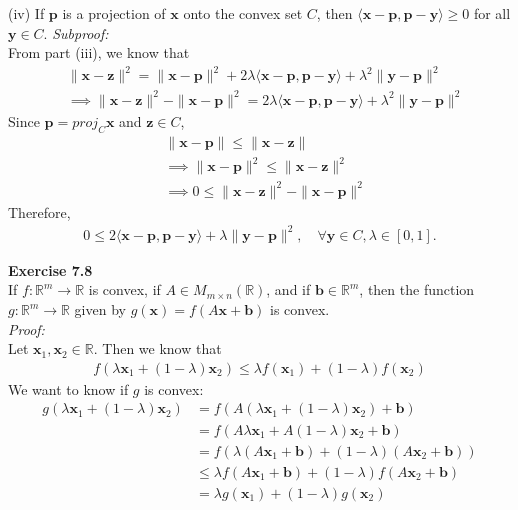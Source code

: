 \documentclass[letterpaper,12pt]{article}
\let\vec\mathbf
\theoremstyle{definition}
\begin{document}
(iv) If $\vec{p}$ is a projection of $\vec{x}$ onto the convex set $C$, then $\langle \vec{x} - \vec{p}, \vec{p} - \vec{y} \rangle \geq 0$ for all $\vec{y} \in C$.
\textit{Subproof:} \\
From part (iii), we know that
\begin{align*}
  &\|\vec{x} - \vec{z}\|^2 = \|\vec{x} - \vec{p}\|^2 + 2\lambda \langle \vec{x} - \vec{p}, \vec{p} - \vec{y} \rangle + \lambda^2 \|\vec{y} - \vec{p}\|^2
  \\
  & \implies \|\vec{x} - \vec{z}\|^2 - \|\vec{x} - \vec{p}\|^2 = 2\lambda \langle \vec{x} - \vec{p}, \vec{p} - \vec{y} \rangle + \lambda^2 \|\vec{y} - \vec{p}\|^2
\end{align*}
Since $\vec{p} = proj_C\vec{x}$ and $\vec{z} \in C$,
\begin{align*}
  &\|\vec{x} - \vec{p}\| \leq \|\vec{x} - \vec{z}\|
  \\
  &\implies \|\vec{x} - \vec{p}\|^2 \leq \|\vec{x} - \vec{z}\|^2
  \\
  &\implies 0 \leq \|\vec{x} - \vec{z}\|^2 - \|\vec{x} - \vec{p}\|^2
\end{align*}
Therefore,
\begin{align*}
  0 \leq 2 \langle \vec{x} - \vec{p}, \vec{p} - \vec{y} \rangle + \lambda\|\vec{y} - \vec{p}\|^2, \quad \forall \vec{y} \in C, \lambda \in [0,1].
\end{align*}

\textbf{Exercise 7.8} \\
If $f: \mathbb{R}^m \to \mathbb{R}$ is convex, if $A \in M_{m \times n}(\mathbb{R})$, and if $\vec{b} \in \mathbb{R}^m$, then the function $g: \mathbb{R}^m \to \mathbb{R}$ given by $g(\vec{x}) = f(A\vec{x} + \vec{b})$ is convex. \\
\textit{Proof:} \\
Let $\vec{x}_1, \vec{x}_2 \in \mathbb{R}$. Then we know that
\begin{align*}
  f(\lambda\vec{x}_1 + (1 - \lambda)\vec{x}_2) \leq \lambda f(\vec{x}_1) + (1 - \lambda) f(\vec{x}_2)
\end{align*}
We want to know if $g$ is convex:
\begin{align*}
  g(\lambda\vec{x}_1 + (1 - \lambda)\vec{x}_2)
  &=
  f(A(\lambda\vec{x}_1 + (1 - \lambda)\vec{x}_2) + \vec{b}) \\
  &= f(A\lambda\vec{x}_1 + A(1 - \lambda)\vec{x}_2 + \vec{b}) \\
  &= f(\lambda(A\vec{x}_1 + \vec{b}) + (1 - \lambda)(A\vec{x}_2 + \vec{b})) \\
  & \leq \lambda f(A\vec{x}_1 + \vec{b}) + (1 - \lambda) f(A\vec{x}_2 + \vec{b}) \\
  &= \lambda g(\vec{x}_1) + (1 - \lambda) g(\vec{x}_2)
\end{align*}
\end{document}
